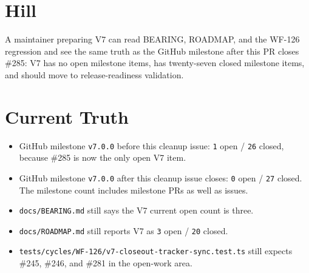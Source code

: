 \section{Hill}\label{record-209-hill}

A maintainer preparing V7 can read BEARING, ROADMAP, and the WF-126 regression and see the same truth as the GitHub milestone after this PR closes \#285: V7 has no open milestone items, has twenty-seven closed milestone items, and should move to release-readiness validation.

\section{Current Truth}\label{record-209-current-truth}

\begin{itemize}
\tightlist
\item
  GitHub milestone \texttt{v\allowbreak{}7\allowbreak{}.\allowbreak{}0\allowbreak{}.\allowbreak{}0} before this cleanup issue: \texttt{1} open / \texttt{2\allowbreak{}6} closed, because \#285 is now the only open V7 item.
\item
  GitHub milestone \texttt{v\allowbreak{}7\allowbreak{}.\allowbreak{}0\allowbreak{}.\allowbreak{}0} after this cleanup issue closes: \texttt{0} open / \texttt{2\allowbreak{}7} closed. The milestone count includes milestone PRs as well as issues.
\item
  \texttt{d\allowbreak{}o\allowbreak{}c\allowbreak{}s\allowbreak{}/\allowbreak{}B\allowbreak{}E\allowbreak{}A\allowbreak{}R\allowbreak{}I\allowbreak{}N\allowbreak{}G\allowbreak{}.\allowbreak{}m\allowbreak{}d} still says the V7 current open count is three.
\item
  \texttt{d\allowbreak{}o\allowbreak{}c\allowbreak{}s\allowbreak{}/\allowbreak{}R\allowbreak{}O\allowbreak{}A\allowbreak{}D\allowbreak{}M\allowbreak{}A\allowbreak{}P\allowbreak{}.\allowbreak{}m\allowbreak{}d} still reports V7 as \texttt{3} open / \texttt{2\allowbreak{}0} closed.
\item
  \texttt{t\allowbreak{}e\allowbreak{}s\allowbreak{}t\allowbreak{}s\allowbreak{}/\allowbreak{}c\allowbreak{}y\allowbreak{}c\allowbreak{}l\allowbreak{}e\allowbreak{}s\allowbreak{}/\allowbreak{}W\allowbreak{}F\allowbreak{}-\allowbreak{}1\allowbreak{}2\allowbreak{}6\allowbreak{}/\allowbreak{}v\allowbreak{}7\allowbreak{}-\allowbreak{}c\allowbreak{}l\allowbreak{}o\allowbreak{}s\allowbreak{}e\allowbreak{}o\allowbreak{}u\allowbreak{}t\allowbreak{}-\allowbreak{}t\allowbreak{}r\allowbreak{}a\allowbreak{}c\allowbreak{}k\allowbreak{}e\allowbreak{}r\allowbreak{}-\allowbreak{}s\allowbreak{}y\allowbreak{}n\allowbreak{}c\allowbreak{}.\allowbreak{}t\allowbreak{}e\allowbreak{}s\allowbreak{}t\allowbreak{}.\allowbreak{}t\allowbreak{}s} still expects \#245, \#246, and \#281 in the open-work area.
\end{itemize}

